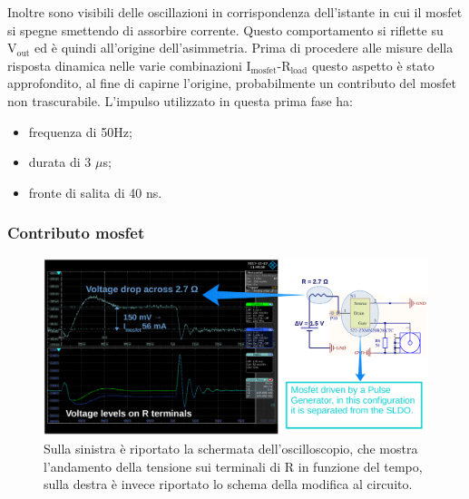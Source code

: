 Inoltre sono visibili delle oscillazioni in corrispondenza dell'istante in cui il mosfet si spegne smettendo di assorbire corrente.
Questo comportamento si riflette su $\mathrm{V_{out}}$ ed è quindi all'origine dell'asimmetria.
Prima di procedere alle misure della risposta dinamica nelle varie combinazioni $\mathrm{I_{mosfet}}$-$\mathrm{R_{load}}$ questo aspetto è stato approfondito, al fine di capirne l'origine, probabilmente un contributo del mosfet non trascurabile.
L'impulso utilizzato in questa prima fase ha:
\begin{itemize}
  \item frequenza di 50Hz;
  \item durata di 3 $\mu$s;
  \item fronte di salita di 40 ns.
\end{itemize}

\subsubsection{Contributo mosfet}
\begin{figure}
\centering
\includegraphics[width=\linewidth]{Immagini/MosfetBehaviour}
\caption{Sulla sinistra è riportato la schermata dell'oscilloscopio, che mostra l'andamento della tensione sui terminali di R in funzione del tempo, sulla destra è invece riportato lo schema della modifica al circuito.}
\label{MosfetBehaviour}
\end{figure}

